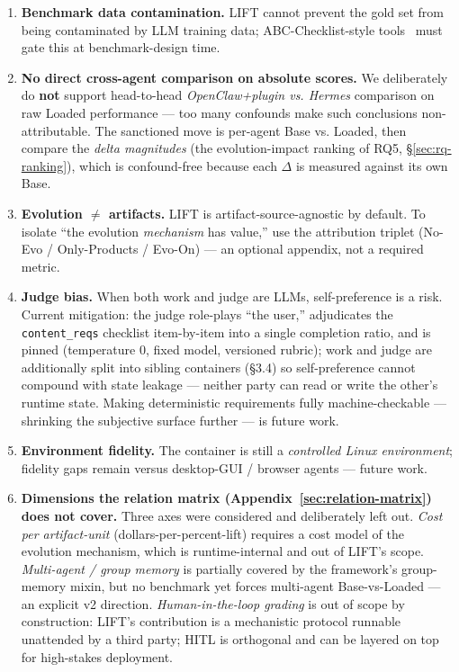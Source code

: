 \documentclass{article}
\begin{document}
\begin{enumerate}
\item \textbf{Benchmark data contamination.} LIFT cannot prevent the gold set from being contaminated by LLM training data; ABC-Checklist-style tools~\citep{zhu2025abc} must gate this at benchmark-design time.
\item \textbf{No direct cross-agent comparison on absolute scores.} We deliberately do \textbf{not} support head-to-head \emph{OpenClaw+plugin vs. Hermes} comparison on raw Loaded performance --- too many confounds make such conclusions non-attributable. The sanctioned move is per-agent Base vs. Loaded, then compare the \emph{delta magnitudes} (the evolution-impact ranking of RQ5, \S\ref{sec:rq-ranking}), which is confound-free because each $\Delta$ is measured against its own Base.
\item \textbf{Evolution $\neq$ artifacts.} LIFT is artifact-source-agnostic by default. To isolate ``the evolution \emph{mechanism} has value,'' use the attribution triplet (No-Evo / Only-Products / Evo-On) --- an optional appendix, not a required metric.
\item \textbf{Judge bias.} When both work and judge are LLMs, self-preference is a risk. Current mitigation: the judge role-plays ``the user,'' adjudicates the \texttt{content\_reqs} checklist item-by-item into a single completion ratio, and is pinned (temperature 0, fixed model, versioned rubric); work and judge are additionally split into sibling containers (\S3.4) so self-preference cannot compound with state leakage --- neither party can read or write the other's runtime state. Making deterministic requirements fully machine-checkable --- shrinking the subjective surface further --- is future work.
\item \textbf{Environment fidelity.} The container is still a \emph{controlled Linux environment}; fidelity gaps remain versus desktop-GUI / browser agents --- future work.
\item \textbf{Dimensions the relation matrix (Appendix~\ref{sec:relation-matrix}) does not cover.} Three axes were considered and deliberately left out. \emph{Cost per artifact-unit} (dollars-per-percent-lift) requires a cost model of the evolution mechanism, which is runtime-internal and out of LIFT's scope. \emph{Multi-agent / group memory} is partially covered by the framework's group-memory mixin, but no benchmark yet forces multi-agent Base-vs-Loaded --- an explicit v2 direction. \emph{Human-in-the-loop grading} is out of scope by construction: LIFT's contribution is a mechanistic protocol runnable unattended by a third party; HITL is orthogonal and can be layered on top for high-stakes deployment.
\end{enumerate}
\end{document}
